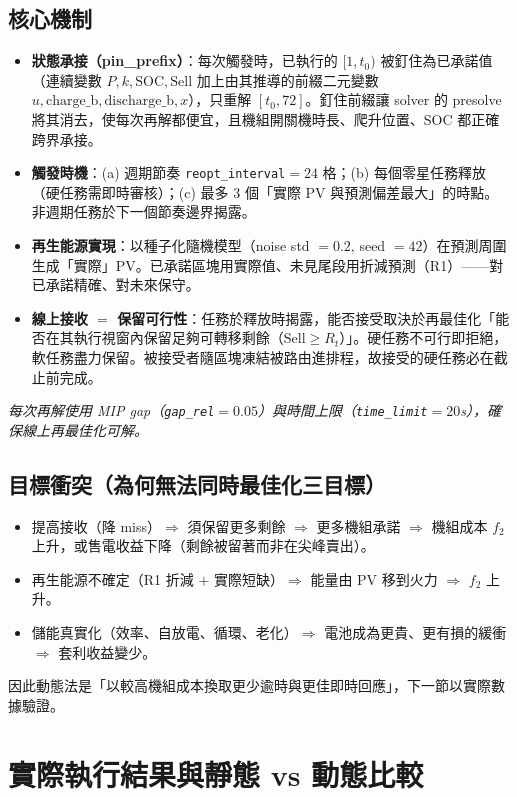 \documentclass[12pt,a4paper,fontset=none]{ctexart}
\newcommand{\fn}[1]{\texttt{\small #1}}
\begin{document}
\subsection{核心機制}
\begin{itemize}
  \item \textbf{狀態承接（pin\_prefix）}：每次觸發時，已執行的 $[1,t_0)$ 被釘住為已承諾值（連續變數 $P,k,\mathrm{SOC},\mathrm{Sell}$ 加上由其推導的前綴二元變數 $u,\mathrm{charge\_b},\mathrm{discharge\_b},x$），只重解 $[t_0,72]$。釘住前綴讓 solver 的 presolve 將其消去，使每次再解都便宜，且機組開關機時長、爬升位置、SOC 都正確跨界承接。
  \item \textbf{觸發時機}：(a) 週期節奏 \fn{reopt\_interval}$=24$ 格；(b) 每個零星任務釋放（硬任務需即時審核）；(c) 最多 3 個「實際 PV 與預測偏差最大」的時點。非週期任務於下一個節奏邊界揭露。
  \item \textbf{再生能源實現}：以種子化隨機模型（noise std $=0.2$, seed $=42$）在預測周圍生成「實際」PV。已承諾區塊用實際值、未見尾段用折減預測（R1）——對已承諾精確、對未來保守。
  \item \textbf{線上接收 $=$ 保留可行性}：任務於釋放時揭露，能否接受取決於再最佳化「能否在其執行視窗內保留足夠可轉移剩餘（$\mathrm{Sell}\ge R_t$）」。硬任務不可行即拒絕，軟任務盡力保留。被接受者隨區塊凍結被路由進排程，故接受的硬任務必在截止前完成。
\end{itemize}
\noindent\textit{每次再解使用 MIP gap（\fn{gap\_rel}$=0.05$）與時間上限（\fn{time\_limit}$=20$s），確保線上再最佳化可解。}

\subsection{目標衝突（為何無法同時最佳化三目標）}
\begin{itemize}
  \item 提高接收（降 miss）$\Rightarrow$ 須保留更多剩餘 $\Rightarrow$ 更多機組承諾 $\Rightarrow$ 機組成本 $f_2$ 上升，或售電收益下降（剩餘被留著而非在尖峰賣出）。
  \item 再生能源不確定（R1 折減 $+$ 實際短缺）$\Rightarrow$ 能量由 PV 移到火力 $\Rightarrow$ $f_2$ 上升。
  \item 儲能真實化（效率、自放電、循環、老化）$\Rightarrow$ 電池成為更貴、更有損的緩衝 $\Rightarrow$ 套利收益變少。
\end{itemize}
因此動態法是「以較高機組成本換取更少逾時與更佳即時回應」，下一節以實際數據驗證。

\section{實際執行結果與靜態 vs 動態比較}
\end{document}
